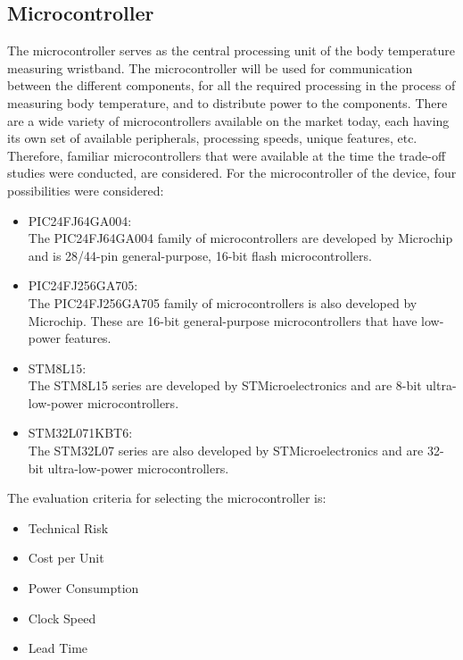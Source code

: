 \subsection{Microcontroller}
The microcontroller serves as the central processing unit of the body temperature measuring wristband. The microcontroller will be used for communication between the different components, for all the required processing in the process of measuring body temperature, and to distribute power to the components. There are a wide variety of microcontrollers available on the market today, each having its own set of available peripherals, processing speeds, unique features, etc. Therefore, familiar microcontrollers that were available at the time the trade-off studies were conducted, are considered. For the microcontroller of the device, four possibilities were considered:
\begin{itemize}
	\item PIC24FJ64GA004:\\
	The PIC24FJ64GA004 family of microcontrollers are developed by Microchip and is 28/44-pin general-purpose, 16-bit flash microcontrollers. 
	\item PIC24FJ256GA705:\\
	The PIC24FJ256GA705 family of microcontrollers is also developed by Microchip. These are 16-bit general-purpose microcontrollers that have low-power features. 
	\item STM8L15:\\
	The STM8L15 series are developed by STMicroelectronics and are 8-bit ultra-low-power microcontrollers. 
	\item STM32L071KBT6:\\
	The STM32L07 series are also developed by STMicroelectronics and are 32-bit ultra-low-power microcontrollers.
\end{itemize}
\noindent
The evaluation criteria for selecting the microcontroller is:
\begin{itemize}[noitemsep]
	\item Technical Risk
	\item Cost per Unit
	\item Power Consumption
	\item Clock Speed
	\item Lead Time
\end{itemize} 
\noindent
